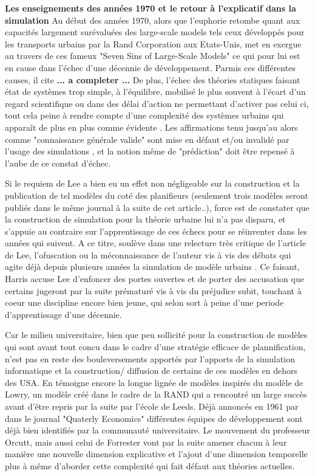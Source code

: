 \textbf{Les enseignements des années 1970 et le retour à l'explicatif dans la simulation} Au début des années 1970, alors que l'euphorie retombe quant aux capacités largement surévaluées des large-scale models  tels ceux développés pour les transports urbains par la Rand Corporation aux Etats-Unis, 
 \autocite{Lee1973} met en exergue au travers de ces fameux "Seven Sins of Large-Scale Models"  ce qui pour lui est en cause dans l'échec d'une décennie de développement. Parmis ces différentes causes, il cite \textbf{... a completer ...} De plus, l'échec des théories statiques faisant état de systèmes trop simple, à l'équilibre, mobilisé le plus souvent à l'écart d'un regard scientifique ou dans des délai d'action ne permettant d'activer pas celui ci, tout cela peine à rendre compte d'une complexité des systèmes urbains qui apparaît de plus en plus comme évidente \autocite[293]{Batty1976}. Les affirmations tenu jusqu'au alors comme "connaissance générale valide" sont mise en défaut et/ou invalidé par l'usage des simulations  \autocite[10]{Batty1994} \cite{Starbucks1983} , et la notion même de "prédiction" doit être repensé à l'aube de ce constat d'échec. 

Si le requiem de Lee a bien eu un effet non négligeable sur la construction et la publication de tel modèles du coté des planifieurs (seulement trois modèles seront publiés dans le même journal à la suite de cet article..), force est de constater que la construction de simulation pour la théorie urbaine  lui n'a pas disparu, et s'appuie au contraire sur l'apprentissage de ces échecs pour se réinventer dans les années qui suivent. A ce titre, \autocite{Harris1994} soulève dans une relecture très critique de l'article de Lee, l'ofuscation ou la méconnaissance de l'auteur vis à vis des débats qui agite déjà depuis plusieurs années la simulation de modèle urbains \autocite{Wilson1970, Orcutt1957, Harris1968}. Ce faisant, Harris accuse Lee d'enfoncer des portes ouvertes et de porter des accusation que certains jugeront par la suite prématuré vis à vis du préjudice subit, touchant à coeur une discipline encore bien jeune, qui selon \autocite[p11]{Batty1994} sort à peine d'une periode d'apprentissage d'une décennie.

 Car le milieu universitaire, bien que peu sollicité pour la construction de modèles qui sont avant tout concu  dans le cadre d'une stratégie efficace de plannification, n'est pas en reste des bouleversements apportés par l'apports de la simulation informatique et la construction/ diffusion de certains de ces modèles en dehors des USA. En témoigne encore la longue lignée de modèles inspirés du modèle de Lowry, un modèle créé dans le cadre de la RAND qui a rencontré un large succès avant d'être repris par la suite par l'école de Leeds. Déjà annoncés en 1961 par \autocite{Cohen1961} dans le journal "Quaterly Economics" différentes équipes de développement  sont déjà bien identifiés par la communauté universitaire. Le mouvement du professeur Orcutt, mais aussi celui de Forrester vont par la suite amener chacun à leur manière une nouvelle dimension explicative et l'ajout d'une dimension temporelle \autocite[p295]{Batty1976} plus à même d'aborder cette complexité qui fait défaut aux théories actuelles.

